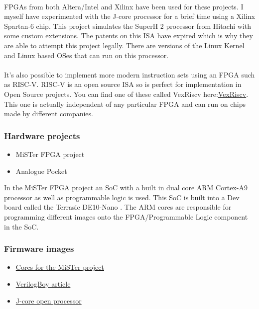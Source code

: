 \documentclass[twocolumn]{article}
\begin{document}
\paragraph{}FPGAs from both Altera/Intel and Xilinx have been used for these projects. I myself have experimented with the J-core processor for a brief time using a Xilinx Spartan-6 chip. This project simulates the SuperH 2 processor from Hitachi with some custom extensions. The patents on this ISA have expired which is why they are able to attempt this project legally. \autocite{j-core-open-processor} There are versions of the Linux Kernel and Linux based OSes that can run on this processor.

\paragraph{}It's also possible to implement more modern instruction sets using an FPGA such as RISC-V. RISC-V is an open source ISA so is perfect for implementation in Open Source projects. You can find one of these called VexRiscv here:\href{https://github.com/SpinalHDL/VexRiscv}{VexRiscv}. This one is actually independent of any particular FPGA and can run on chips made by different companies.

\subsubsection{Hardware projects}
\begin{itemize}
    \item MiSTer FPGA project
    \item Analogue Pocket
\end{itemize}

In the MiSTer FPGA project an SoC with a built in dual core ARM Cortex-A9 processor as well as programmable logic\autocite{terrasic} is used. This SoC is built into a Dev board called the Terrasic DE10-Nano \autocite{mister}. The ARM cores are responsible for programming different images onto the FPGA/Programmable Logic component in the SoC.

\subsubsection{Firmware images}
\begin{itemize}
    \item \href{https://boogermann.github.io/Bible_MiSTer/core-status/}{Cores for the MiSTer project}
    \item \href{https://hackaday.com/2019/03/23/game-boy-recreated-in-verilog/}{VerilogBoy article}
    \item \href{https://j-core.org/}{J-core open processor}
\end{itemize}
\end{document}
